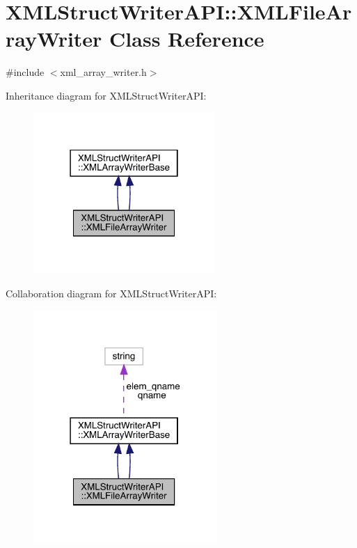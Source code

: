 \hypertarget{classXMLStructWriterAPI_1_1XMLFileArrayWriter}{}\section{X\+M\+L\+Struct\+Writer\+A\+PI\+:\+:X\+M\+L\+File\+Array\+Writer Class Reference}
\label{classXMLStructWriterAPI_1_1XMLFileArrayWriter}


{\ttfamily \#include $<$xml\+\_\+array\+\_\+writer.\+h$>$}



Inheritance diagram for X\+M\+L\+Struct\+Writer\+A\+PI\+:\nopagebreak
\begin{figure}[H]
\begin{center}
\leavevmode
\includegraphics[width=195pt]{d3/d88/classXMLStructWriterAPI_1_1XMLFileArrayWriter__inherit__graph}
\end{center}
\end{figure}


Collaboration diagram for X\+M\+L\+Struct\+Writer\+A\+PI\+:\nopagebreak
\begin{figure}[H]
\begin{center}
\leavevmode
\includegraphics[width=198pt]{d8/d22/classXMLStructWriterAPI_1_1XMLFileArrayWriter__coll__graph}
\end{center}
\end{figure}
